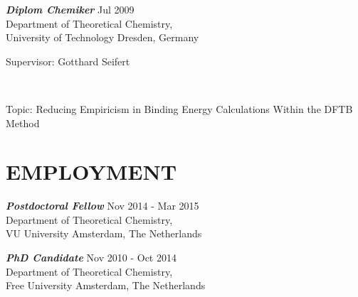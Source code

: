 \documentclass[line,margin]{res}
\begin{document}
\begin{resume}
{\sl\textbf{Diplom Chemiker}} \hfill{} Jul 2009 \\
                \hspace*{1cm} Department of Theoretical Chemistry,\\ 
                \smallskip\hspace*{1cm} University of Technology Dresden, Germany\\
				\hspace*{.5cm}\parbox[t]{12.5cm}{Supervisor: Gotthard Seifert}\\				\hspace*{.5cm}\parbox[t]{12.5cm}{Topic: Reducing Empiricism in Binding Energy Calculations Within the DFTB Method}%
                   
\section{EMPLOYMENT} {\sl\textbf{Postdoctoral Fellow}} \hfill\smallskip Nov 2014 - Mar 2015\\
                \hspace*{1cm} Department of Theoretical Chemistry,\\ 
                \hspace*{1cm} VU University Amsterdam, The Netherlands
                
{\sl\textbf{PhD Candidate}} \hfill\smallskip Nov 2010 - Oct 2014\\
                \hspace*{1cm} Department of Theoretical Chemistry,\\ 
                \hspace*{1cm} Free University Amsterdam, The Netherlands
                

\end{resume}
\end{document}
